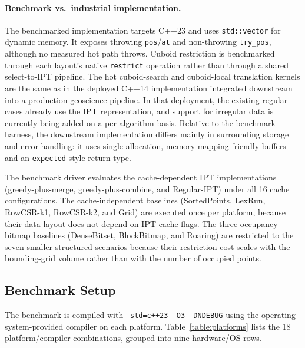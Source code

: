 \documentclass[manuscript,screen,review]{acmart}
\theoremstyle{definition}
\theoremstyle{plain}
\begin{document}
\paragraph{Benchmark vs.\ industrial implementation.}
The benchmarked implementation targets C++23 and uses
\texttt{std::vector} for dynamic memory. It exposes throwing
\texttt{pos}/\texttt{at} and non-throwing \texttt{try\_pos}, although
no measured hot path throws. Cuboid restriction is benchmarked through
each layout's native \texttt{restrict} operation rather than through a
shared select-to-IPT pipeline. The hot cuboid-search and
cuboid-local translation kernels are the same as in the deployed
C++14 implementation integrated downstream into a
production geoscience pipeline. In that deployment, the existing
regular cases already use the IPT representation, and support for
irregular data is currently being added on a per-algorithm basis.
Relative to the benchmark harness, the downstream implementation
differs mainly in surrounding storage and error handling: it uses
single-allocation, memory-mapping-friendly buffers and an
\texttt{expected}-style return type.

The benchmark driver evaluates the cache-dependent IPT implementations
(greedy-plus-merge, greedy-plus-combine, and Regular-IPT) under all
16 cache configurations.
The cache-independent baselines (SortedPoints, LexRun, RowCSR-k1,
RowCSR-k2, and Grid) are executed once per platform, because their data
layout does not depend on IPT cache flags.
The three occupancy-bitmap baselines (DenseBitset, BlockBitmap, and
Roaring) are restricted to the seven smaller structured scenarios because
their restriction cost scales with the bounding-grid volume rather than
with the number of occupied points.

\subsection{Benchmark Setup}
\label{section:setup}

The benchmark is compiled with
\texttt{-std=c++23 -O3 -DNDEBUG} using the operating-system-provided
compiler on each platform.
Table~\ref{table:platforms} lists the 18 platform/compiler combinations,
grouped into nine hardware/OS rows.
\end{document}
